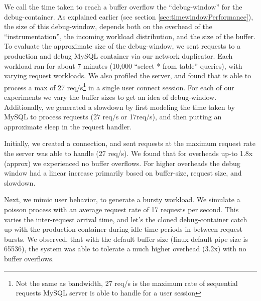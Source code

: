 \noindent
We call the time taken to reach a buffer overflow the ``debug-window'' for the debug-container.
As explained earlier (see section \ref{sec:timewindowPerformance}), the size of this debug-window, depends both on the overhead of the ``instrumentation'', the incoming workload distribution, and the size of the buffer.
To evaluate the approximate size of the debug-window, we sent requests to a production and debug MySQL container via our network duplicator.
Each workload ran for about 7 minutes (10,000 ``select * from table'' queries), with varying request workloads.
%
We also profiled the server, and found that is able to process a max of 27 req/s\footnote{Not the same as bandwidth, 27 req/s is the maximum rate of sequential requests MySQL server is able to handle for a user session} in a single user connect session. 
For each of our experiments we vary the buffer sizes to get an idea of debug-window. 
Additionally, we generated a slowdown by first modeling the time taken by MySQL to process requests (27 req/s or 17req/s), and then putting an approximate sleep in the request handler.

Initially, we created a connection, and sent requests at the maximum request rate the server was able to handle (27 req/s).
We found that for overheads up-to 1.8x (approx) we experienced no buffer overflows.
For higher overheads the debug window had a linear increase primarily based on buffer-size, request size, and slowdown.

Next, we mimic user behavior, to generate a bursty workload.
We simulate a poisson process with an average request rate of 17 requests per second. 
This varies the inter-request arrival time, and let's the cloned debug-container catch up with the production container during idle time-periods in between request bursts.
We observed, that with the default buffer size (linux default pipe size is 65536), the system was able to tolerate a much higher overhead (3.2x) with no buffer overflows.

